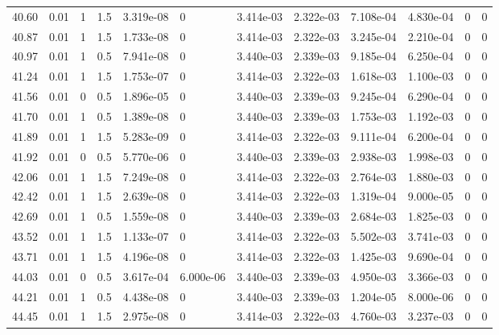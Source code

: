 \documentclass[preview]{standalone}
\begin{document}
{{{{\begin{tabular}{L{1.2cm}C{1.2cm} C{0.3cm}C{0.5cm} C{1.4cm}C{1.4cm} C{1.4cm}C{1.4cm} C{1.6cm}C{1.6cm} C{1.6cm}C{1.6cm}}
  40.60  &  0.01  & 1     & 1.5 &  3.319e-08  & 0  &  3.414e-03&   2.322e-03& 7.108e-04 & 4.830e-04   &  0 & 0  \\ 
  40.87  &  0.01  & 1     & 1.5 &  1.733e-08  & 0  &  3.414e-03&   2.322e-03& 3.245e-04 & 2.210e-04   &  0 & 0  \\ 
  40.97  &  0.01  & 1     & 0.5 &  7.941e-08  & 0  &  3.440e-03&   2.339e-03& 9.185e-04 & 6.250e-04   &  0 & 0  \\ 
  41.24  &  0.01  & 1     & 1.5 &  1.753e-07  & 0  &  3.414e-03&   2.322e-03& 1.618e-03 & 1.100e-03   &  0 & 0  \\ 
  41.56  &  0.01  & 0     & 0.5 &  1.896e-05  & 0  &  3.440e-03&   2.339e-03& 9.245e-04 & 6.290e-04   &  0 & 0  \\ 
  41.70  &  0.01  & 1     & 0.5 &  1.389e-08  & 0  &  3.440e-03&   2.339e-03& 1.753e-03 & 1.192e-03   &  0 & 0  \\ 
  41.89  &  0.01  & 1     & 1.5 &  5.283e-09  & 0  &  3.414e-03&   2.322e-03& 9.111e-04 & 6.200e-04   &  0 & 0  \\ 
  41.92  &  0.01  & 0     & 0.5 &  5.770e-06  & 0  &  3.440e-03&   2.339e-03& 2.938e-03 & 1.998e-03   &  0 & 0  \\ 
  42.06  &  0.01  & 1     & 1.5 &  7.249e-08  & 0  &  3.414e-03&   2.322e-03& 2.764e-03 & 1.880e-03   &  0 & 0  \\ 
  42.42  &  0.01  & 1     & 1.5 &  2.639e-08  & 0  &  3.414e-03&   2.322e-03& 1.319e-04 & 9.000e-05   &  0 & 0  \\ 
  42.69  &  0.01  & 1     & 0.5 &  1.559e-08  & 0  &  3.440e-03&   2.339e-03& 2.684e-03 & 1.825e-03   &  0 & 0  \\ 
  43.52  &  0.01  & 1     & 1.5 &  1.133e-07  & 0  &  3.414e-03&   2.322e-03& 5.502e-03 & 3.741e-03   &  0 & 0  \\ 
  43.71  &  0.01  & 1     & 1.5 &  4.196e-08  & 0  &  3.414e-03&   2.322e-03& 1.425e-03 & 9.690e-04   &  0 & 0  \\ 
  44.03  &  0.01  & 0     & 0.5 &  3.617e-04  & 6.000e-06  &  3.440e-03&   2.339e-03& 4.950e-03 & 3.366e-03   &  0 & 0  \\ 
  44.21  &  0.01  & 1     & 0.5 &  4.438e-08  & 0  &  3.440e-03&   2.339e-03& 1.204e-05 & 8.000e-06   &  0 & 0  \\ 
  44.45  &  0.01  & 1     & 1.5 &  2.975e-08  & 0  &  3.414e-03&   2.322e-03& 4.760e-03 & 3.237e-03   &  0 & 0  \\ 
\hline 
\end{tabular} 

}}}}
\end{document}
